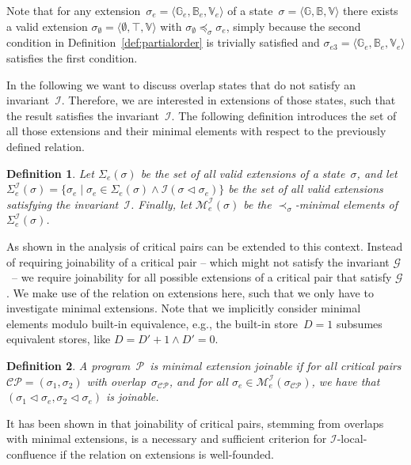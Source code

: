\documentclass{tlp}
\newtheorem{definition}{Definition}[section]
\newcommand{\st}[3]{\ensuremath{\langle #1 , #2 , #3 \rangle}}
\newcommand{\mcCP}{\ensuremath{\mathcal{CP}}}
\newcommand{\mcI}{\ensuremath{\mathcal{I}}}
\newcommand{\mcG}{\ensuremath{\mathcal{G}}}
\newcommand{\mcP}{\ensuremath{\mathcal{P}}}
\newcommand{\bbB}{\ensuremath{\mathbb{B}}}
\newcommand{\bbG}{\ensuremath{\mathbb{G}}}
\newcommand{\bbV}{\ensuremath{\mathbb{V}}}
\newcommand{\extend}{\ensuremath{\lhd}}
\newcommand{\sigcp}{\ensuremath{\sigma_{\mcCP}}}
\begin{document}
Note that for any extension~$\sigma_e = \st{\bbG_e}{\bbB_e}{\bbV_e}$ of a
state~$\sigma = \st{\bbG}{\bbB}{\bbV}$ there exists a valid extension
$\sigma_{\emptyset} = \st{\emptyset}{\top}{\bbV}$ with $\sigma_{\emptyset}
\preceq_{\sigma} \sigma_e$, simply because the second condition in
Definition~\ref{def:partialorder} is trivially satisfied and $\sigma_{e3} =
\st{\bbG_e}{\bbB_e}{\bbV_e}$ satisfies the first condition.

In the following we want to discuss overlap states that do not satisfy an
invariant~\mcI. Therefore, we are interested in extensions of those states, such
that the result satisfies the invariant~\mcI. The following definition introduces
the set of all those extensions and their minimal elements with respect to the
previously defined relation.

\begin{definition}

Let $\Sigma_e(\sigma)$ be the set of all valid extensions of a state~$\sigma$,
and let $\Sigma^\mcI_e(\sigma) = \{ \sigma_e \mid \sigma_e \in \Sigma_e(\sigma)
\land \mcI(\sigma \extend \sigma_e)\}$ be the set of all valid extensions
satisfying the invariant~\mcI. Finally, let $\mathcal{M}^\mcI_e(\sigma)$ be the
$\prec_{\sigma}$-minimal elements of $\Sigma^\mcI_e(\sigma)$.
\end{definition}

As shown in \cite{duckstuckeysulzmann07} the analysis of critical pairs can be
extended to this context. Instead of requiring joinability of a critical pair --
which might not satisfy the invariant \mcG\ -- we require joinability for all
possible extensions of a critical pair that satisfy \mcG. We make use of the
relation on extensions here, such that we only have to investigate minimal
extensions. Note that we implicitly consider minimal elements modulo built-in
equivalence, e.g., the built-in store~$D=1$ subsumes equivalent stores, like
$D=D'+1 \land D'=0$.

\begin{definition}

A program~\mcP\ is \emph{minimal extension joinable} if for all critical pairs
$\mcCP = (\sigma_1, \sigma_2)$ with overlap~\sigcp, and for all $\sigma_e \in
\mathcal{M}^\mcI_e(\sigcp)$, we have that $(\sigma_1 \extend \sigma_e, \sigma_2
\extend \sigma_e)$ is joinable.
\end{definition}

It has been shown in \cite{duckstuckeysulzmann07} that joinability of critical
pairs, stemming from overlaps with minimal extensions, is a necessary and
sufficient criterion for \mcI-local-confluence if the relation on extensions is
well-founded.
\end{document}
